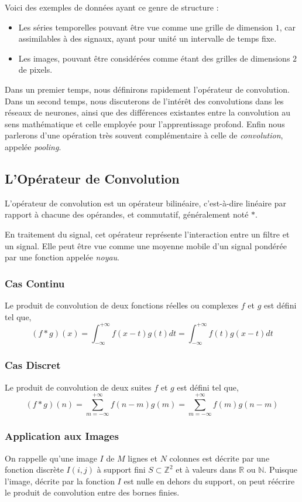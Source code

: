 \documentclass[a4paper, 10pt]{report}
\begin{document}
Voici des exemples de données ayant ce genre de structure :
\begin{itemize}
	\item Les séries temporelles pouvant être vue comme une grille de dimension $1$, car assimilables à des signaux, ayant pour unité un intervalle de temps fixe.
	\item Les images, pouvant être considérées comme étant des grilles de dimensions $2$ de pixels.
\end{itemize}
Dans un premier temps, nous définirons rapidement l'opérateur de convolution.
Dans un second temps, nous discuterons de l'intérêt des convolutions dans les réseaux de neurones, ainsi que des différences existantes entre la convolution au sens mathématique et celle employée pour l'apprentissage profond.
Enfin nous parlerons d'une opération très souvent complémentaire à celle de \emph{convolution}, appelée \emph{pooling}.
\subsection{L'Opérateur de Convolution}
L'opérateur de convolution est un opérateur bilinéaire, c'est-à-dire linéaire par rapport à chacune des opérandes, et commutatif, généralement noté $*$.

En traitement du signal, cet opérateur représente l’interaction entre un filtre et un signal.
Elle peut être vue comme une moyenne mobile d'un signal pondérée par une fonction appelée \emph{noyau}.
\subsubsection{Cas Continu}
Le produit de convolution de deux fonctions réelles ou complexes $f$ et $g$ est défini tel que,
$$(f * g)(x) = \int_{-\infty}^{+\infty}{f(x-t)g(t)dt} = \int_{-\infty}^{+\infty}{f(t)g(x-t)dt}$$
\subsubsection{Cas Discret}
Le produit de convolution de deux suites $f$ et $g$ est défini tel que,
$$(f *g)(n) = \sum_{m = -\infty}^{+\infty}{f(n-m)g(m)} = \sum_{m = -\infty}^{+\infty}{f(m)g(n-m)}$$
\subsubsection{Application aux Images}
On rappelle qu'une image $I$ de $M$ lignes et $N$ colonnes est décrite par une fonction discrète $I(i,j)$ à support fini $S \subset \mathbb{Z}^2$ et à valeurs dans $\mathbb{R}$ ou $\mathbb{N}$.
Puisque l'image, décrite par la fonction $I$ est nulle en dehors du support, on peut réécrire le produit de convolution entre des bornes finies.
\end{document}
